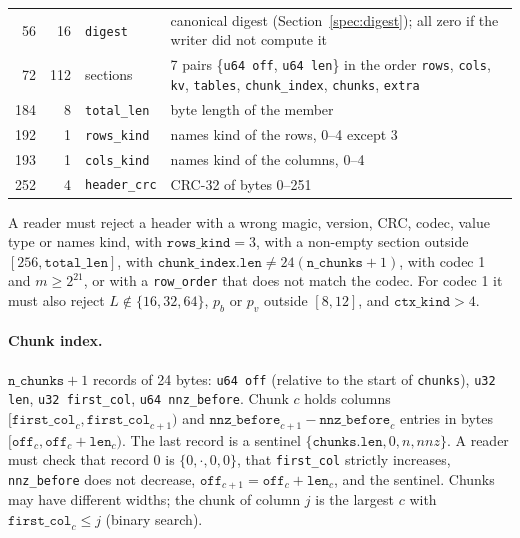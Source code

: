 \begin{table}[htbp]
\begin{tabularx}{\linewidth}{@{}rrlX@{}}
56  & 16 & \texttt{digest}  & canonical digest (Section~\ref{spec:digest}); all zero if the writer did not compute it \\
72  & 112 & sections & 7 pairs \{\texttt{u64 off}, \texttt{u64 len}\} in the order \texttt{rows}, \texttt{cols}, \texttt{kv}, \texttt{tables}, \texttt{chunk\_index}, \texttt{chunks}, \texttt{extra} \\
184 & 8  & \texttt{total\_len} & byte length of the member \\
192 & 1  & \texttt{rows\_kind} & names kind of the rows, 0--4 except 3 \\
193 & 1  & \texttt{cols\_kind} & names kind of the columns, 0--4 \\
252 & 4  & \texttt{header\_crc} & CRC-32 of bytes 0--251 \\
\bottomrule
\end{tabularx}
\end{table}

A reader must reject a header with a wrong magic, version, CRC, codec, value type or names kind, with
$\texttt{rows\_kind}=3$, with a non-empty section outside $[256,\texttt{total\_len}]$, with
$\texttt{chunk\_index.len}\neq 24(\texttt{n\_chunks}+1)$, with codec 1 and $m\ge 2^{21}$, or with a \texttt{row\_order}
that does not match the codec. For codec 1 it must also reject $L\notin\{16,32,64\}$, $p_b$ or $p_v$ outside $[8,12]$,
and $\texttt{ctx\_kind}>4$.

\paragraph{Chunk index.}
$\texttt{n\_chunks}+1$ records of 24 bytes: \texttt{u64 off} (relative to the start of \texttt{chunks}),
\texttt{u32 len}, \texttt{u32 first\_col}, \texttt{u64 nnz\_before}. Chunk $c$ holds columns
$[\texttt{first\_col}_c,\texttt{first\_col}_{c+1})$ and $\texttt{nnz\_before}_{c+1}-\texttt{nnz\_before}_c$ entries in
bytes $[\texttt{off}_c,\texttt{off}_c+\texttt{len}_c)$. The last record is a sentinel
$\{\texttt{chunks.len},0,n,\mathit{nnz}\}$. A reader must check that record 0 is $\{0,\cdot,0,0\}$, that
\texttt{first\_col} strictly increases, \texttt{nnz\_before} does not decrease, $\texttt{off}_{c+1}=\texttt{off}_c+\texttt{len}_c$,
and the sentinel. Chunks may have different widths; the chunk of column $j$ is the largest $c$ with
$\texttt{first\_col}_c\le j$ (binary search).

